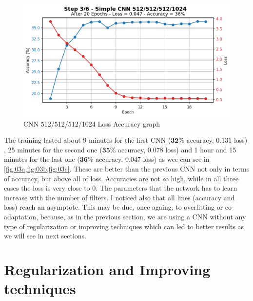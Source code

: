\documentclass[a4paper, 11pt]{article}
\begin{document}
	\begin{figure}[ht!]
		\centering
		\includegraphics[width=0.6\paperwidth]{img/fig03c.png}
		\caption{CNN 512/512/512/1024 Loss Accuracy graph}
		\label{fig:03c}
	\end{figure}
	
	The training lasted about 9 minutes for the first CNN ($\boldsymbol{32\%}$ accuracy, $\boldsymbol{0.131}$ loss)  , 25 minutes for the second one ($\boldsymbol{35\%}$ accuracy, $\boldsymbol{0.078}$ loss) and 1 hour and 15 minutes for the last one ($\boldsymbol{36\%}$ accuracy, $\boldsymbol{0.047}$ loss) as wee can see in \vref{fig:03a,fig:03b,fig:03c}.
	These are better than the previous CNN not only in terms of accuracy, but above all of loss. Accuracies are not so high, while in all three cases the loss is very close to $0$. The parameters that the network has to learn increase with the number of filters. I noticed also that all lines (accuracy and loss) reach an asymptote.  
	This may be due, once againg, to overfitting or co-adaptation, because, as in the previous section,  we are using a CNN without any type of regularization or improving techniques which can led to better results as we will see in next sections.
		
	\FloatBarrier
	
	\section{Regularization and Improving techniques}
		
	
	
	
	
	
\end{document}
